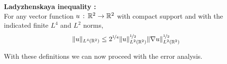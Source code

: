 \begin{definition} \label{def:Ladyzhenskaya}
  \textbf{Ladyzhenskaya inequality \cite{Layton08}:}\\
  For any vector function $u\,:\, \mathbb{R}^2 \rightarrow \mathbb{R}^2$ with compact support
  and with the indicated finite $L^4$ and $L^2$ norms,
  \begin{equation}
    \|u\|_{L^4(\mathbb{R}^2)} \le 2^{\nicefrac{1}{4}}
      \|u\|^{\nicefrac{1}{2}}_{L^2(\mathbb{R}^2)}
      \|\nabla u\|^{\nicefrac{1}{2}}_{L^2(\mathbb{R}^2)}
    \label{eqn:Ladyzhenskaya}
  \end{equation}
\end{definition}
With these definitions we can now proceed with the error analysis.
